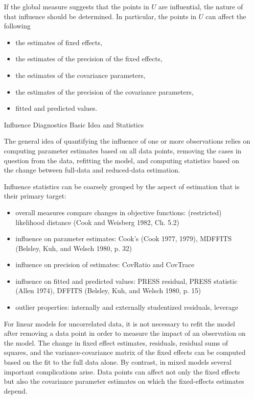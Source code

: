 \documentclass[Main.tex]{subfiles}
\begin{document}
If the global measure suggests that the points in $U$ are influential, the nature of that influence should be determined. In particular, the points in $U$ can affect the following

\begin{itemize}
\item the estimates of fixed effects,
\item the estimates of the precision of the fixed effects,
\item the estimates of the covariance parameters,
\item the estimates of the precision of the covariance parameters,
\item fitted and predicted values.
\end{itemize}

\newpage


Influence Diagnostics
Basic Idea and Statistics

The general idea of quantifying the influence of one or more observations relies on computing parameter estimates based on all data points, removing the cases in question from the data, refitting the model, and computing statistics based on the change between full-data and reduced-data estimation. 

Influence statistics can be coarsely grouped by the aspect of estimation that is their primary target:
\begin{itemize}
\item overall measures compare changes in objective functions: (restricted) likelihood distance (Cook and Weisberg 1982, Ch. 5.2)
\item influence on parameter estimates: Cook’s  (Cook 1977, 1979), MDFFITS (Belsley, Kuh, and Welsch 1980, p. 32)
\item influence on precision of estimates: CovRatio and CovTrace
\item influence on fitted and predicted values: PRESS residual, PRESS statistic (Allen 1974), DFFITS (Belsley, Kuh, and Welsch 1980, p. 15)
\item outlier properties: internally and externally studentized residuals, leverage
\end{itemize}
For linear models for uncorrelated data, it is not necessary to refit the model after removing a data point in order to measure the impact of an observation on the model. The change in fixed effect estimates, residuals, residual sums of squares, and the variance-covariance matrix of the fixed effects can be computed based on the fit to the full data alone. By contrast, in mixed models several important complications arise. Data points can affect not only the fixed effects but also the covariance parameter estimates on which the fixed-effects estimates depend. 
\end{document}
